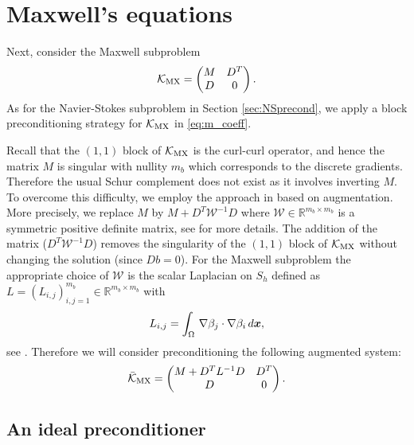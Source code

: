 \section{Maxwell's equations}
\label{sec:MaxwellPrecond}

Next, consider the Maxwell subproblem
\begin{equation}
\label{eq:m_coeff}
\mathcal{K}_{\rm MX}=
\begin{pmatrix}
M & D^T \\
D & 0
\end{pmatrix}.
\end{equation}
As for the Navier-Stokes subproblem in Section \ref{sec:NSprecond}, we apply a block preconditioning strategy for $\mathcal{K}_{\rm MX}$ in  \eqref{eq:m_coeff}.

Recall that the $(1,1)$ block of $\mathcal{K}_{\rm MX}$ is the curl-curl operator, and hence the matrix $M$ is singular with nullity $m_b$ which corresponds to the discrete gradients. Therefore the usual Schur complement does not exist as it involves inverting $M$. To overcome this difficulty, we employ the approach in  \cite{golub2003solving,greif2006preconditioners} based on  augmentation. More precisely, we replace $M$ by $M+D^T\mathcal{W}^{-1}D$ where $\mathcal{W}\in {\mathbb R}^{m_b\times m_b}$ is a symmetric positive definite matrix, see \cite{golub2003solving,greif2006preconditioners} for more details. The addition of the matrix ($D^T\mathcal{W}^{-1}D$) removes the singularity of the $(1,1)$ block of $\mathcal{K}_{\rm MX}$ without changing the solution (since $Db = 0$). For the Maxwell subproblem the appropriate choice of $\mathcal{W}$ is the scalar Laplacian on $S_h$ defined as $L=(L_{i,j})_{i,j=1}^{m_b} \in{\mathbb R}^{m_b \times m_b}$ with
\begin{equation}
\label{eq:scalar_laplace}
L_{i,j}=\int_\Omega\,\nabla\beta_j\cdot\nabla\beta_i\,d\boldsymbol x,
\end{equation}
see  \cite{greif2007preconditioners}. Therefore we will consider preconditioning the following augmented system:
\begin{equation}
\label{eq:AugmentMaxwell}
\bar{\mathcal{K}}_{\rm MX}=
\begin{pmatrix}
M + D^TL^{-1}D & D^T \\
D & 0
\end{pmatrix}.
\end{equation}

\subsection{An ideal preconditioner}


